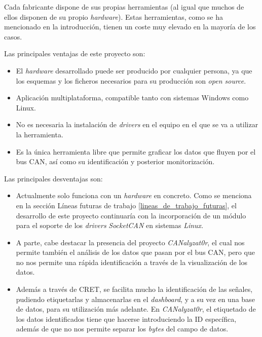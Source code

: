 

Cada fabricante dispone de sus propias herramientas (al igual que muchos de ellos disponen de su propio \emph{hardware}). Estas herramientas, como se ha mencionado en la introducción, tienen un coste muy elevado en la mayoría de los casos.

Las principales ventajas de este proyecto son:

\begin{itemize}

\item
El \emph{hardware} desarrollado puede ser producido por cualquier persona, ya que los esquemas y los ficheros necesarios para su producción son \emph{open source}.
\item
Aplicación multiplataforma, compatible tanto con sistemas Windows como Linux.
\item
No es necesaria la instalación de \emph{drivers} en el equipo en el que se va a utilizar la herramienta.
\item
Es la única herramienta libre que permite graficar los datos que fluyen por el bus CAN, así como su identificación y posterior monitorización.

\end{itemize}

Las principales desventajas son:

\begin{itemize}
\item
Actualmente solo funciona con un \emph{hardware} en concreto. Como se menciona en la sección Líneas futuras de trabajo \ref{lineas_de_trabajo_futuras}, el desarrollo de este proyecto continuaría con la incorporación de un módulo para el soporte de los \emph{drivers} \emph{SocketCAN} en sistemas \emph{Linux}.
\item
A parte, cabe destacar la presencia del proyecto \emph{CANalyzat0r}\cite{ canalyzator:can}, el cual nos permite también el análisis de los datos que pasan por el bus CAN, pero que no nos permite una rápida identificación a través de la visualización de los datos. 
\item
Además a través de CRET, se facilita mucho la identificación de las señales, pudiendo etiquetarlas y almacenarlas en el \emph{dashboard}, y a su vez en una base de datos, para su utilización más adelante. En \emph{CANalyzat0r}, el etiquetado de los datos identificados tiene que hacerse introduciendo la ID específica, además de que no nos permite separar los \emph{bytes} del campo de datos.
\end{itemize}


